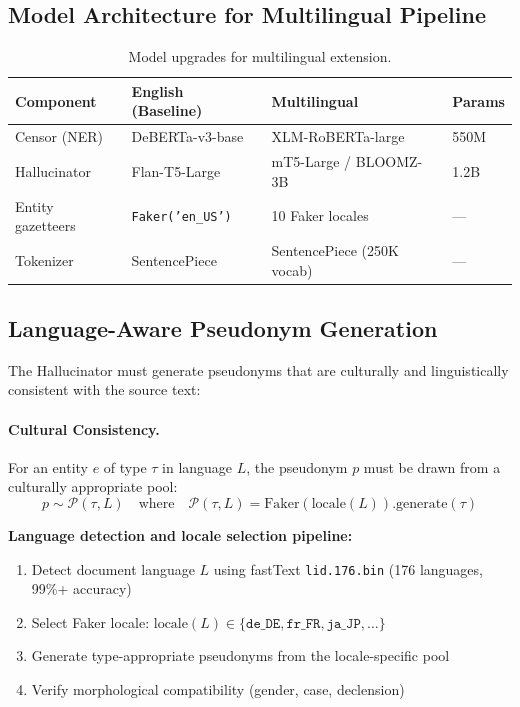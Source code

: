 \documentclass[11pt, a4paper]{article}
\begin{document}
\subsection{Model Architecture for Multilingual Pipeline}

\begin{table}[H]
\centering
\small
\begin{tabular}{llll}
\toprule
\textbf{Component} & \textbf{English (Baseline)} & \textbf{Multilingual} & \textbf{Params} \\
\midrule
Censor (NER) & DeBERTa-v3-base & XLM-RoBERTa-large & 550M \\
Hallucinator & Flan-T5-Large & mT5-Large / BLOOMZ-3B & 1.2B \\
Entity gazetteers & \texttt{Faker('en\_US')} & 10 Faker locales & --- \\
Tokenizer & SentencePiece & SentencePiece (250K vocab) & --- \\
\bottomrule
\end{tabular}
\caption{Model upgrades for multilingual extension.}
\end{table}

\subsection{Language-Aware Pseudonym Generation}

The Hallucinator must generate pseudonyms that are culturally and linguistically consistent with the source text:

\paragraph{Cultural Consistency.}
For an entity $e$ of type $\tau$ in language $L$, the pseudonym $p$ must be drawn from a culturally appropriate pool:
\begin{equation}
p \sim \mathcal{P}(\tau, L) \quad \text{where} \quad \mathcal{P}(\tau, L) = \text{Faker}(\text{locale}(L)).\text{generate}(\tau)
\end{equation}

\textbf{Language detection and locale selection pipeline:}
\begin{enumerate}
  \item Detect document language $L$ using fastText \texttt{lid.176.bin} (176 languages, 99\%+ accuracy)
  \item Select Faker locale: $\text{locale}(L) \in \{\texttt{de\_DE}, \texttt{fr\_FR}, \texttt{ja\_JP}, \ldots\}$
  \item Generate type-appropriate pseudonyms from the locale-specific pool
  \item Verify morphological compatibility (gender, case, declension)
\end{enumerate}
\end{document}
